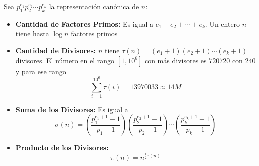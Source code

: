Sea $p_1^{e_1} p_2^{e_2} \cdots p_k^{e_k}$ la representaci\'on can\'onica de $n$:
    
\begin{itemize}
    \item{
		\textbf{Cantidad de Factores Primos:}
		Es igual a $e_1 + e_2 + \cdots + e_k$. Un entero $n$ tiene hasta $\log n$ factores primos
    }
    \item{
		\textbf{Cantidad de Divisores:}
		$n$ tiene $\tau(n) = (e_1 + 1) (e_2 + 1) \cdots (e_k + 1)$ divisores. El n\'umero en el rango $[1, 10^6]$ con m\'as 
		divisores es $ 720720 $ con $240$ y para ese rango
		$$ \sum_{i=1}^{10^6} \tau(i) = 13970033 \approx 14M$$ 
    }
    \item{
		\textbf{Suma de los Divisores:}
		Es igual a 
		$$ \sigma(n) = \left( \frac{p_1^{e_1 + 1} - 1}{p_1 - 1} \right) \left( \frac{p_2^{e_2 + 1} - 1}{p_2 - 1} \right) 
		\cdots \left( \frac{p_k^{e_k + 1} - 1}{p_k - 1} \right) $$
    }
    \item{
		\textbf{Producto de los Divisores:}
		$$\pi(n) = n ^{\frac{1}{2} \tau(n)}$$
    }
\end{itemize}
